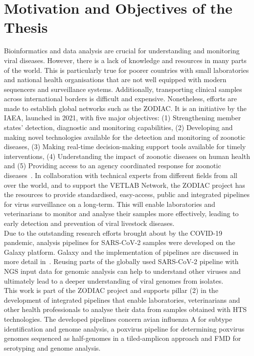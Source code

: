 \section{Motivation and Objectives of the Thesis}
Bioinformatics and data analysis are crucial for understanding and monitoring viral diseases. However, there is a lack of knowledge and resources in many parts of the world. This is particularly true for poorer countries with small laboratories and national health organisations that are not well equipped with modern sequencers and surveillance systems. Additionally, transporting clinical samples across international borders is difficult and expensive. Nonetheless, efforts are made to establish global networks such as the \ac{ZODIAC}. It is an initiative by the \ac{IAEA}, launched in 2021, with five major objectives: (1) Strengthening member states' detection, diagnostic and monitoring capabilities, (2) Developing and making novel technologies available for the detection and monitoring of zoonotic diseases, (3) Making real-time decision-making support tools available for timely interventions, (4) Understanding the impact of zoonotic diseases on human health and (5) Providing access to an agency coordinated response for zoonotic diseases~\cite{zodiac2021}. In collaboration with technical experts from different fields from all over the world, and to support the \ac{VETLAB} Network, the \ac{ZODIAC} project has the resources to provide standardised, easy-access, public and integrated pipelines for virus surveillance on a long-term. This will enable laboratories and veterinarians to monitor and analyse their samples more effectively, leading to early detection and prevention of viral livestock diseases. \\
Due to the outstanding research efforts brought about by the \ac{COVID-19} pandemic, analysis pipelines for \ac{SARS-CoV-2} samples were developed on the Galaxy platform. Galaxy and the implementation of pipelines are discussed in more detail in~. Reusing parts of the globally used \ac{SARS-CoV-2} pipeline with \ac{NGS} input data for genomic analysis can help to understand other viruses and ultimately lead to a deeper understanding of viral genomes from isolates. \\
This work is part of the \ac{ZODIAC} project and supports pillar (2) in the development of integrated pipelines that enable laboratories, veterinarians and other health professionals to analyse their data from samples obtained with \ac{HTS} technologies. The developed pipelines concern avian influenza A for subtype identification and genome analysis, a poxvirus pipeline for determining poxvirus genomes sequenced as half-genomes in a tiled-amplicon approach and \ac{FMD} for serotyping and genome analysis.

